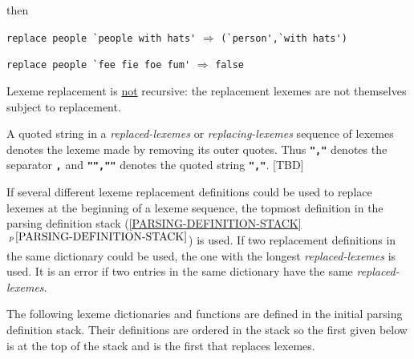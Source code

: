 \documentclass[12pt]{article}
\newcommand{\TT}[1]{{\tt \bfseries #1}}
\newcommand{\secref}[1]{\ref{#1}$\,^{p\,\pageref{#1}}$}
\begin{document}
then

\begin{center}
\verb|replace people `people with hats'| $\Longrightarrow$
\verb|(`person',`with hats')|

\verb|replace people `fee fie foe fum'| $\Longrightarrow$ \verb|false|
\end{center}


Lexeme replacement is \underline{not} recursive: the replacement lexemes are
not themselves subject to replacement.

A quoted string in a {\em replaced-lexemes} or {\em replacing-lexemes}
sequence of lexemes denotes the lexeme made by removing its outer quotes.
Thus \TT{","} denotes the separator
\TT{,} and \TT{"",""} denotes the quoted string \TT{","}. [TBD]

If several different lexeme replacement definitions could be used to
replace lexemes at the beginning of a lexeme sequence, the topmost
definition in the parsing definition stack
(\secref{PARSING-DEFINITION-STACK}) is used.
If two replacement definitions in the same dictionary could be used,
the one with the longest {\em replaced-lexemes} is used.  It is an error if
two entries in the same dictionary have the same {\em replaced-lexemes}.

The following lexeme dictionaries and functions are
defined in the initial parsing definition stack.
Their definitions are ordered in the
stack so the first given below is at the top of the stack and is the
first that replaces lexemes.
\end{document}
